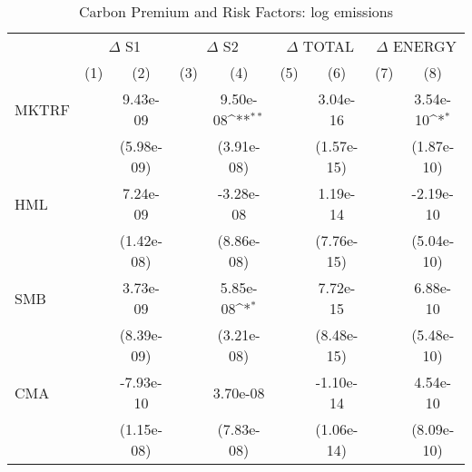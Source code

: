 \begin{table}[htbp]\centering
\def\sym#1{\ifmmode^{#1}\else\(^{#1}\)\fi}
\caption{Carbon Premium and Risk Factors: log emissions}
\begin{tabular}{l*{8}{c}}
\hline\hline
                    &\multicolumn{2}{c}{$\Delta$ S1}            &\multicolumn{2}{c}{$\Delta$ S2}            &\multicolumn{2}{c}{$\Delta$ TOTAL}         &\multicolumn{2}{c}{$\Delta$ ENERGY}        \\\cmidrule(lr){2-3}\cmidrule(lr){4-5}\cmidrule(lr){6-7}\cmidrule(lr){8-9}
                    &\multicolumn{1}{c}{(1)}         &\multicolumn{1}{c}{(2)}         &\multicolumn{1}{c}{(3)}         &\multicolumn{1}{c}{(4)}         &\multicolumn{1}{c}{(5)}         &\multicolumn{1}{c}{(6)}         &\multicolumn{1}{c}{(7)}         &\multicolumn{1}{c}{(8)}         \\
\hline
MKTRF               &                     &    9.43e-09         &                     &    9.50e-08\sym{**} &                     &    3.04e-16         &                     &    3.54e-10\sym{*}  \\
                    &                     &  (5.98e-09)         &                     &  (3.91e-08)         &                     &  (1.57e-15)         &                     &  (1.87e-10)         \\
[1em]
HML                 &                     &    7.24e-09         &                     &   -3.28e-08         &                     &    1.19e-14         &                     &   -2.19e-10         \\
                    &                     &  (1.42e-08)         &                     &  (8.86e-08)         &                     &  (7.76e-15)         &                     &  (5.04e-10)         \\
[1em]
SMB                 &                     &    3.73e-09         &                     &    5.85e-08\sym{*}  &                     &    7.72e-15         &                     &    6.88e-10         \\
                    &                     &  (8.39e-09)         &                     &  (3.21e-08)         &                     &  (8.48e-15)         &                     &  (5.48e-10)         \\
[1em]
CMA                 &                     &   -7.93e-10         &                     &    3.70e-08         &                     &   -1.10e-14         &                     &    4.54e-10         \\
                    &                     &  (1.15e-08)         &                     &  (7.83e-08)         &                     &  (1.06e-14)         &                     &  (8.09e-10)         \\

\end{tabular}
\end{table}
